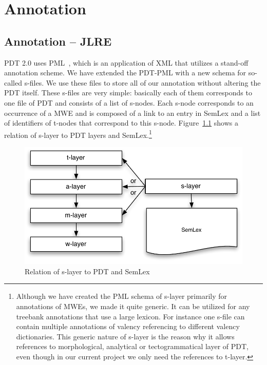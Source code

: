 
\chapter{Annotation}
\label{sec:annot}

\section{Annotation – JLRE}
\label{sec:annot:jlre}

PDT 2.0 uses PML~\citep{pajas:2005}, which is an application of XML that utilizes a stand-off annotation scheme. We have extended the PDT-PML with a new schema for so-called s-files. We use these files to store all of our annotation without altering the PDT itself.
These s-files are very simple: basically each of them corresponds to one file of PDT and consists of a list of s-nodes. Each s-node corresponds to an occurrence of a MWE and is composed of a link to an entry in SemLex and a list of identifiers of t-nodes that correspond to this \mbox{s-node}. Figure~\ref{fig:s-layer} shows a relation of s-layer to PDT layers and SemLex.\footnote{Although we have created the PML schema of s-layer primarily for annotations of MWEs, we made it quite generic. It can be utilized for any treebank annotations that use a large lexicon. For instance one s-file can contain multiple annotations of valency referencing to different valency dictionaries. This generic nature of s-layer is the reason why it allows references to morphological, analytical or tectogrammatical layer of PDT, even though in our current project we only need the references to t-layer.}
\begin{figure}[htbp]
   \centering
   \includegraphics[scale=.5]{images/layers-with-s-layer.pdf} %
   \caption{Relation of s-layer to PDT and SemLex}
    \label{fig:s-layer}
\end{figure}


